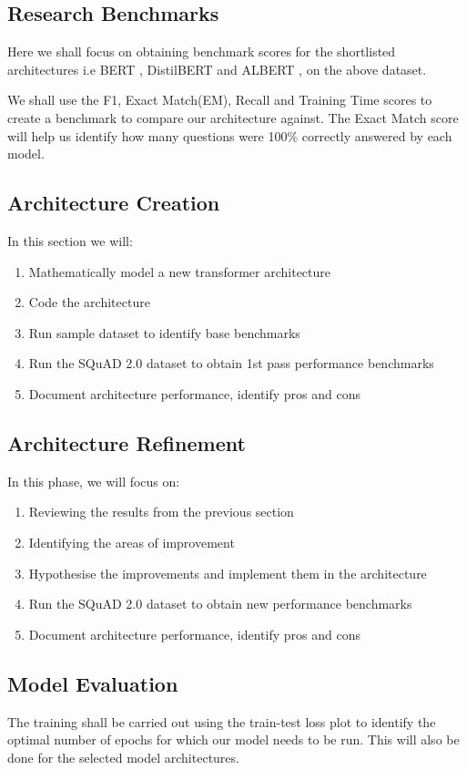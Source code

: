 \documentclass[11pt]{article}
\begin{document}
	\subsection{Research Benchmarks}\label{benchmarks}
	Here we shall focus on obtaining benchmark scores for the shortlisted architectures i.e BERT \citep{bert}, DistilBERT \citep{distil} and ALBERT \cite{albert}, on the above dataset.

	We shall use the F1, Exact Match(EM), Recall and Training Time scores to create a benchmark to compare our architecture against. The Exact Match score will help us identify how many questions were 100\% correctly answered by each model.

	\subsection{Architecture Creation}\label{architecturecreation}
	In this section we will:

	\begin{enumerate}
		\item{Mathematically model a new transformer architecture}
		\item{Code the architecture}
		\item{Run sample dataset to identify base benchmarks}
		\item{Run the SQuAD 2.0 dataset to obtain 1st pass performance benchmarks}
		\item{Document architecture performance, identify pros and cons}
	\end{enumerate}
	\subsection{Architecture Refinement}\label{refinement}
	In this phase, we will focus on:
	\begin{enumerate}
		\item{Reviewing the results from the previous section}
		\item{Identifying the areas of improvement}
		\item{Hypothesise the improvements and implement them in the architecture}
		\item{Run the SQuAD 2.0 dataset to obtain new performance benchmarks}
		\item{Document architecture performance, identify pros and cons}
	\end{enumerate}
	\subsection{Model Evaluation}
	The training shall be carried out using the train-test loss plot to identify the optimal number of epochs for which our model needs to be run. This will also be done for the selected model architectures.
\end{document}
